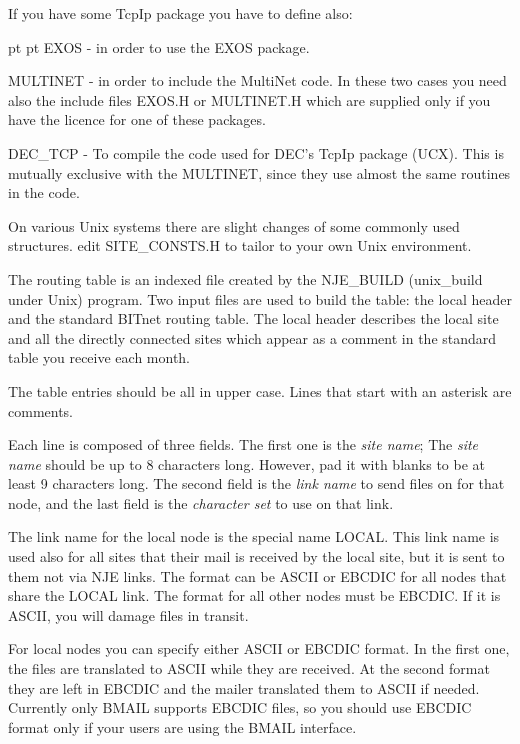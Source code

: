 If you have some TcpIp package you have to define also:

{ pt  pt
{\ncrBold EXOS} - in order to use the EXOS package.

{\ncrBold MULTINET} - in order to include the MultiNet code.
In these two cases you need also the include files EXOS.H or  MULTINET.H
which  are  supplied  only  if  you  have  the  licence for one of these
packages.

{\ncrBold DEC\_TCP} - To compile the code used for DEC's TcpIp package (UCX).
This is mutually exclusive with the MULTINET, since they use almost the same
routines in the code.
}

On various Unix systems there are slight  changes  of  some  commonly
used   structures.  edit  SITE\_CONSTS.H  to  tailor  to  your  own  Unix
environment.

\vfill\eject


The routing table  is  an  indexed  file  created  by  the {\ncrBold NJE\_BUILD}
({\ncrBold unix\_build} under Unix) program. Two input files are used to
build the
table: the local header and the standard BITnet routing table. The local
header  describes  the  local  site and all the directly connected sites
which appear as a comment in the standard table you receive each month.

{\ncrBold The table entries should be all in upper case. Lines that start  with
an asterisk are comments.}

Each  line  is  composed  of  three fields. The first one is the {\sl site
name}; The {\sl site name} should be up to 8 characters long. However, pad it
with  blanks  to  be at least 9 characters long. The second field is the
{\sl link name} to send files on for that node, and  the  last  field  is  the
{\sl character set} to use on that link.

The link name for the local node is the special name {\ncrBold LOCAL}. This link
name is used also for all sites that their mail is received by the local
site,  but it is sent to them not via NJE links. The format can be 
{\ncrBold ASCII}
or {\ncrBold EBCDIC} for all nodes that share the LOCAL link. The  format
for  all
other nodes must be {\ncrBold EBCDIC}. If it is ASCII, you will damage files in
transit.

For local nodes you can specify either ASCII or EBCDIC format. In the
first one, the files are translated to ASCII while they are received. At
the second format they are left in EBCDIC and the mailer translated them
to  ASCII  if needed. Currently only BMAIL supports EBCDIC files, so you
should use EBCDIC  format  only  if  your  users  are  using  the  BMAIL
interface.

